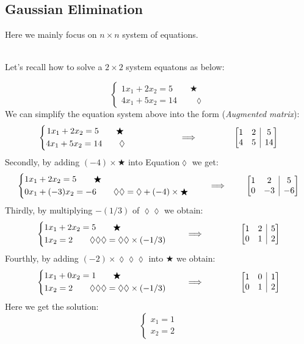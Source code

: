 \subsection{Gaussian Elimination}

Here we mainly focus on $n \times n$ system of equations. 

\begin{example} \qquad
\\
Let's recall how to solve a $2 \times 2$ system equatons as below:

\[
\left \{	\begin{gathered}
1x_1 + 2x_2 =5 \qquad \bigstar	\\
4x_1 + 5x_2 = 14 \qquad \lozenge
\end{gathered}	\right.
\]
We can simplify the equation system above into the form (\emph{Augmented matrix}):
\[
\left \{	\begin{gathered}
1x_1 + 2x_2 =5 \qquad \bigstar	\\
4x_1 + 5x_2 = 14 \qquad \lozenge
\end{gathered}	\right.
\qquad\qquad\qquad \implies \qquad\qquad
\left[
\begin{array}{@{}cc|c@{}}
1 & 2 & 5 \\
4 & 5 & 14
\end{array}
\right]
\]
Secondly, by adding $(-4)\times \bigstar$ into Equation$\lozenge$ we get:
\[
\left \{	\begin{lgathered}
{1}x_1 + 2x_2 =5 \qquad \bigstar	\\
0x_1 + (-3)x_2 = -6 \qquad \lozenge\lozenge = \lozenge + (-4)\times\bigstar
\end{lgathered}	\right.
\qquad \implies \qquad
\left[
\begin{array}{@{}cc|c@{}}
1 & 2 & 5 \\
0 & -3 & -6
\end{array}
\right]
\]
Thirdly, by multiplying $-(1/3)$ of $\lozenge\lozenge$ we obtain:
\[
\left \{	\begin{lgathered}
{1}x_1 + 2x_2 =5 \qquad \bigstar	\\
1x_2 = 2 \qquad \lozenge\lozenge\lozenge = \lozenge\lozenge \times (-1/3)
\end{lgathered}	\right.
\qquad \implies \qquad\qquad
\left[
\begin{array}{@{}cc|c@{}}
1 & 2 & 5 \\
0 & 1 & 2
\end{array}
\right]
\]
Fourthly, by adding $(-2)\times\lozenge\lozenge\lozenge$ into $\bigstar$ we obtain:
\[
\left \{	\begin{lgathered}
{1}x_1 + 0x_2 =1 \qquad \bigstar	\\
1x_2 = 2 \qquad \lozenge\lozenge\lozenge = \lozenge\lozenge \times (-1/3)
\end{lgathered}	\right.
\qquad \implies \qquad\qquad
\left[
\begin{array}{@{}cc|c@{}}
1 & 0 & 1 \\
0 & 1 & 2 
\end{array}
\right]
\]
Here we get the solution:
 \[\left\{
\begin{gathered}
x_{1} = 1 \\
x_{2} = 2
\end{gathered} \right.
\]
\end{example}
